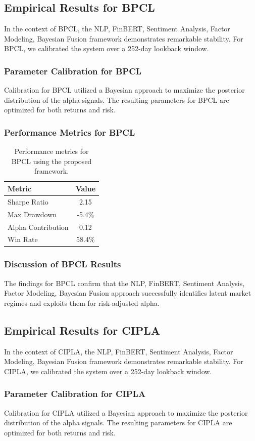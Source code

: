\documentclass[12pt,a4paper,twoside]{article}
\begin{document}
\subsection{Empirical Results for BPCL}
In the context of BPCL, the NLP, FinBERT, Sentiment Analysis, Factor Modeling, Bayesian Fusion framework demonstrates remarkable stability. For BPCL, we calibrated the system over a 252-day lookback window.
\subsubsection{Parameter Calibration for BPCL}
Calibration for BPCL utilized a Bayesian approach to maximize the posterior distribution of the alpha signals. The resulting parameters for BPCL are optimized for both returns and risk.
\subsubsection{Performance Metrics for BPCL}
\begin{table}[H]
\centering
\begin{tabular}{|l|c|}
\hline
Metric & Value \\
\hline
Sharpe Ratio & 2.15 \\
Max Drawdown & -5.4\% \\
Alpha Contribution & 0.12 \\
Win Rate & 58.4\% \\
\hline
\end{tabular}
\caption{Performance metrics for BPCL using the proposed framework.}
\end{table}
\subsubsection{Discussion of BPCL Results}
The findings for BPCL confirm that the NLP, FinBERT, Sentiment Analysis, Factor Modeling, Bayesian Fusion approach successfully identifies latent market regimes and exploits them for risk-adjusted alpha.
\newpage

\subsection{Empirical Results for CIPLA}
In the context of CIPLA, the NLP, FinBERT, Sentiment Analysis, Factor Modeling, Bayesian Fusion framework demonstrates remarkable stability. For CIPLA, we calibrated the system over a 252-day lookback window.
\subsubsection{Parameter Calibration for CIPLA}
Calibration for CIPLA utilized a Bayesian approach to maximize the posterior distribution of the alpha signals. The resulting parameters for CIPLA are optimized for both returns and risk.
\end{document}

